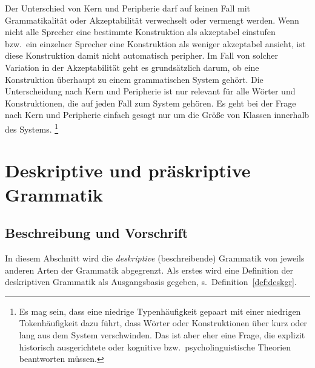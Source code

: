 

Der Unterschied von Kern und Peripherie darf auf keinen Fall mit Grammatikalität oder Akzeptabilität verwechselt oder vermengt werden.
Wenn nicht alle Sprecher eine bestimmte Konstruktion als akzeptabel einstufen bzw.\ ein einzelner Sprecher eine Konstruktion als weniger akzeptabel ansieht, ist diese Konstruktion damit nicht automatisch peripher.
Im Fall von solcher Variation in der Akzeptabilität geht es grundsätzlich darum, ob eine Konstruktion überhaupt zu einem grammatischen System gehört.
Die Unterscheidung nach Kern und Peripherie ist nur relevant für alle Wörter und Konstruktionen, die auf jeden Fall zum System gehören.
Es geht bei der Frage nach Kern und Peripherie einfach gesagt nur um die Größe von Klassen innerhalb des Systems.%
\footnote{Es mag sein, dass eine niedrige Typenhäufigkeit gepaart mit einer niedrigen Tokenhäufigkeit dazu führt, dass Wörter oder Konstruktionen über kurz oder lang aus dem System verschwinden.
Das ist aber eher eine Frage, die explizit historisch ausgerichtete oder kognitive bzw.\ psycholinguistische Theorien beantworten müssen.}


\section{Deskriptive und präskriptive Grammatik}

\label{sec:deskriptivenormativegrammatik}

\subsection{Beschreibung und Vorschrift}

In diesem Abschnitt wird die \textit{deskriptive} (beschreibende) Grammatik von jeweils anderen Arten der Grammatik abgegrenzt.
Als erstes wird eine Definition der deskriptiven Grammatik als Ausgangsbasis gegeben, s.\ Definition~\ref{def:deskgr}.

